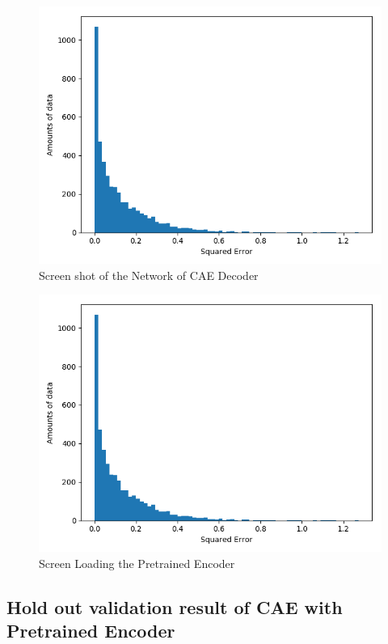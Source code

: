 \documentclass{article}
\begin{document}
\begin{figure}[h]
  \centering
  \includegraphics[scale=0.3]{fifa_lg.png}
  \caption{Screen shot of the Network of CAE Decoder}
\end{figure}

\begin{figure}[h]
  \centering
  \includegraphics[scale=0.3]{fifa_lg.png}
  \caption{Screen Loading the Pretrained Encoder}
\end{figure}

\subsection{Hold out validation result of CAE with Pretrained Encoder}
\end{document}
